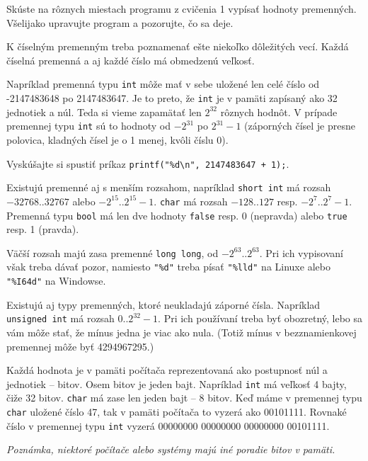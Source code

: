 \cvicenie Skúste na rôznych miestach programu z cvičenia 1 vypísať hodnoty
premenných. Všelijako upravujte program a pozorujte, čo sa deje.
\fakeriesenie


K číselným premenným treba poznamenať ešte niekoľko dôležitých vecí.  Každá
číselná premenná a aj každé číslo má obmedzenú veľkosť.

Napríklad premenná typu \verb!int! môže mať v sebe uložené len celé číslo od
-2147483648 po 2147483647. Je to preto, že \verb!int! je v pamäti zapísaný ako
32 jednotiek a núl. Teda si vieme zapamätať len $2^{32}$ rôznych hodnôt. V
prípade premennej typu \verb!int! sú to hodnoty od $-2^{31}$ po $2^{31}-1$
(záporných čísel je presne polovica, kladných čísel je o 1 menej, kvôli číslu
0).

\cvicenie Vyskúšajte si spustiť príkaz \verb!printf("%d\n", 2147483647 + 1);!.
\fakeriesenie

\medskip

Existujú premenné aj s menším rozsahom, napríklad \verb!short int! má rozsah
$-32768..32767$ alebo $-2^{15}..2^{15}-1$.  \verb!char! má rozsah $-128..127$
resp. $-2^7..2^7-1$. Premenná typu \verb!bool! má len dve hodnoty 
\verb!false! resp. 0 (nepravda) alebo \verb!true! resp. 1 (pravda).

Väčší rozsah majú zasa premenné \verb!long long!, od $-2^{63}..2^{63}$. Pri ich
vypisovaní však treba dávať pozor, namiesto \verb!"%d"! treba písať
\verb!"%lld"! na Linuxe alebo \verb!"%I64d"! na Windowse.

Existujú aj typy premenných, ktoré neukladajú záporné čísla. Napríklad
\verb!unsigned int! má rozsah $0..2^{32}-1$.  Pri ich používaní treba byť
obozretný, lebo sa vám môže stať, že mínus jedna je viac ako nula.  (Totiž mínus
v bezznamienkovej premennej môže byť 4294967295.)


Každá hodnota je v pamäti počítača reprezentovaná ako postupnosť núl a
jednotiek -- bitov. Osem bitov je jeden bajt. Napríklad \verb!int! má veľkosť 4
bajty, čiže 32 bitov. \verb!char! má zase len jeden bajt -- 8 bitov. Keď máme v
premennej typu \verb!char! uložené číslo 47, tak v pamäti počítača to vyzerá
ako 00101111. Rovnaké číslo v premennej typu \verb!int! vyzerá 00000000
00000000 00000000 00101111. 

\textit{Poznámka, niektoré počítače alebo systémy majú iné poradie bitov v
pamäti.}

